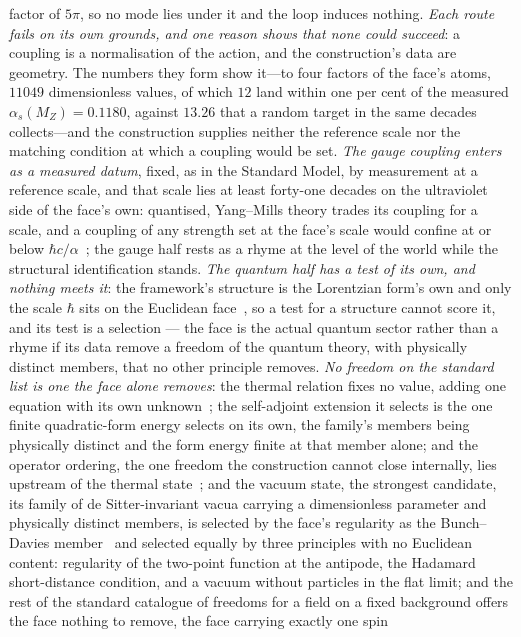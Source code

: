 \documentclass[11pt,a4paper]{article}
\theoremstyle{plain}
\theoremstyle{definition}
\theoremstyle{remark}
\begin{document}
\begin{enumerate}
factor of $5\pi$, so no mode lies under it and the loop induces nothing. \emph{Each route fails on its own grounds, and one reason shows that none could succeed}: a coupling is a normalisation of the action, and the construction's data are geometry. The numbers they form show it---to four factors of the face's atoms, $11049$ dimensionless values, of which $12$ land within one per cent of the measured $\alpha_s(M_Z)=0.1180$, against $13.26$ that a random target in the same decades collects---and the construction supplies neither the reference scale nor the matching condition at which a coupling would be set. \emph{The gauge coupling enters as a measured datum}, fixed, as in the Standard Model, by measurement at a reference scale, and that scale lies at least forty-one decades on the ultraviolet side of the face's own: quantised, Yang--Mills theory trades its coupling for a scale, and a coupling of any strength set at the face's scale would confine at or below $\hbar c/\alpha$~\cite{JanzenMatter,JanzenBoundary}; the gauge half rests as a rhyme at the level of the world while the structural identification stands.  \emph{The quantum half has a test of its own, and nothing meets it}: the framework's structure is the Lorentzian form's own and only the scale $\hbar$ sits on the Euclidean face~\cite{JanzenBoundary}, so a test for a structure cannot score it, and its test is a selection --- the face is the actual quantum sector rather than a rhyme if its data remove a freedom of the quantum theory, with physically distinct members, that no other principle removes. \emph{No freedom on the standard list is one the face alone removes}: the thermal relation fixes no value, adding one equation with its own unknown~\cite{JanzenCanonicalTime}; the self-adjoint extension it selects is the one finite quadratic-form energy selects on its own, the family's members being physically distinct and the form energy finite at that member alone; and the operator ordering, the one freedom the construction cannot close internally, lies upstream of the thermal state~\cite{JanzenCanonicalTime}; and the vacuum state, the strongest candidate, its family of de Sitter-invariant vacua carrying a dimensionless parameter and physically distinct members, is selected by the face's regularity as the Bunch--Davies member~\cite{JanzenDynamics} and selected equally by three principles with no Euclidean content: regularity of the two-point function at the antipode, the Hadamard short-distance condition, and a vacuum without particles in the flat limit; and the rest of the standard catalogue of freedoms for a field on a fixed background offers the face nothing to remove, the face carrying exactly one spin 
\end{enumerate}
\end{document}
